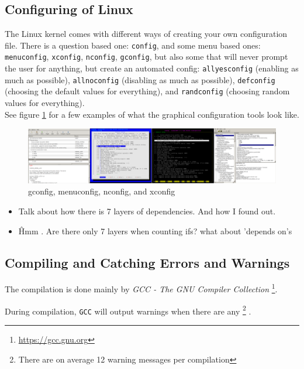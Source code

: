\documentclass[a4paper,11pt]{report}
\newcommand{\figa}{
    \begin{figure}[!htpb]
    \centering
}
\newcommand{\figb}[2]{
    \caption{#1}
    \label{#2}
    \end{figure}
}
\begin{document}
        \subsection{Configuring of Linux}

The Linux kernel comes with different ways of creating your own configuration 
file. There is a question based one: \texttt{config}, and some menu based ones:
\texttt{menuconfig}, \texttt{xconfig}, \texttt{nconfig}, \texttt{gconfig}, 
but also some that will never prompt the user for anything, but create an 
automated config: \texttt{allyesconfig} (enabling as much as possible), 
\texttt{allnoconfig} (disabling as much as possible), \texttt{defconfig} 
(choosing the default values for everything), and \texttt{randconfig} (choosing 
random values for everything).
\\

See figure \ref{fig:lineofconfigs} for a few examples of what the graphical 
configuration tools look like.
\\


\figa
    \includegraphics[scale=0.25]{pngs/configs50percent.png}
\figb{gconfig, menuconfig, nconfig, and xconfig}{fig:lineofconfigs}


\begin{itemize}
    \item Talk about how there is 7 layers of dependencies. And how I found out.
    \item \^ Hmm . Are there only 7 layers when counting ifs? what about 
        'depends on's
\end{itemize}


\subsection{Compiling and Catching Errors and Warnings}

The compilation is done mainly by \emph{GCC - The GNU Compiler Collection}
    \footnote{\url{https://gcc.gnu.org}}.

During compilation, \texttt{GCC} will output warnings when there are any
    \footnote{There are on average 12 warning messages per compilation}
.
\end{document}
